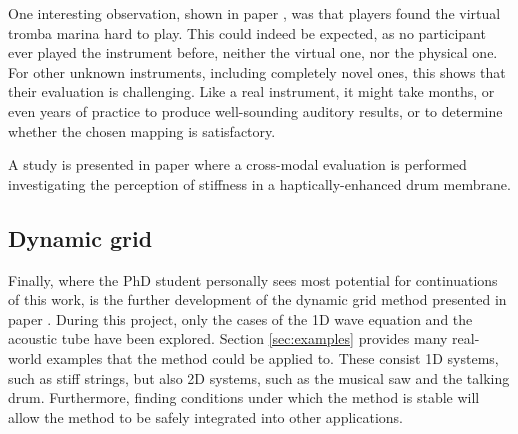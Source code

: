 One interesting observation, shown in paper \citeP[E], was that players found the virtual tromba marina hard to play. This could indeed be expected, as no participant ever played the instrument before, neither the virtual one, nor the physical one. For other unknown instruments, including completely novel ones, this shows that their evaluation is challenging. Like a real instrument, it might take months, or even years of practice to produce well-sounding auditory results, or to determine whether the chosen mapping is satisfactory.

A study is presented in paper \citeP[F] where a cross-modal evaluation is performed investigating the perception of stiffness in a haptically-enhanced drum membrane.



\subsection{Dynamic grid}
Finally, where the PhD student personally sees most potential for continuations of this work, is the further development of the dynamic grid method presented in paper \citeP[G]. During this project, only the cases of the 1D wave equation and the acoustic tube have been explored. Section \ref{sec:examples} provides many real-world examples that the method could be applied to. These consist 1D systems, such as stiff strings, but also 2D systems, such as the musical saw and the talking drum. Furthermore, finding conditions under which the method is stable will allow the method to be safely integrated into other applications.

